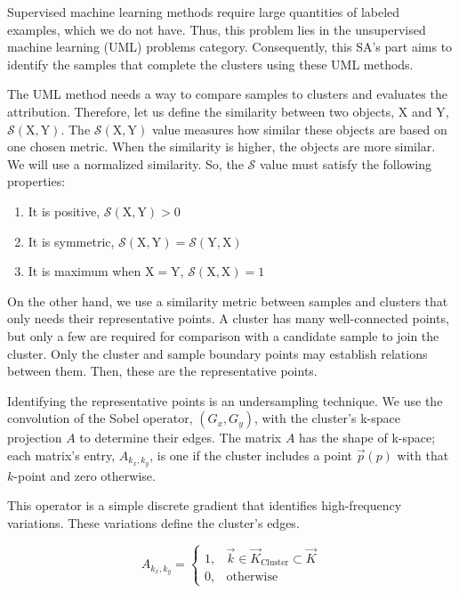 \documentclass[a4paper,12pt]{report}
\begin{document}
\begin{appendices}
Supervised machine learning methods require large quantities of labeled examples, which we do not have. Thus, this problem lies in the unsupervised machine learning (UML) problems category. Consequently, this SA's part aims to identify the samples that complete the clusters using these UML methods.

The UML method needs a way to compare samples to clusters and evaluates the attribution. Therefore, let us define the similarity between two objects, $\mathrm{X}$ and $\mathrm{Y}$, $\mathcal{S}(\mathrm{X}, \mathrm{Y})$. The $\mathcal{S}(\mathrm{X}, \mathrm{Y})$ value measures how similar these objects are based on one chosen metric. When the similarity is higher, the objects are more similar. We will use a normalized similarity.
So, the $\mathcal{S}$ value must satisfy the following properties:

\begin{enumerate}
    \item It is positive, $\mathcal{S}(\mathrm{X}, \mathrm{Y}) > 0$
    \item It is symmetric, $\mathcal{S}(\mathrm{X}, \mathrm{Y}) = \mathcal{S}(\mathrm{Y}, \mathrm{X})$
    \item It is maximum when $\mathrm{X}=\mathrm{Y}$, $\mathcal{S}(\mathrm{X}, \mathrm{X})=1$
\end{enumerate}

On the other hand, we use a similarity metric between samples and clusters that only needs their representative points. A cluster has many well-connected points, but only a few are required for comparison with a candidate sample to join the cluster. Only the cluster and sample boundary points may establish relations between them. Then, these are the representative points.

Identifying the representative points is an undersampling technique.
We use the convolution of the Sobel operator, $(G_x, G_y)$, with the cluster's k-space projection $A$ to determine their edges.
The matrix $A$ has the shape of k-space; each matrix's entry, $A_{k_x,k_y}$, is one if the cluster includes a point $\vec{p}(p)$ with that $k$-point and zero otherwise.

 This operator is a simple discrete gradient that identifies high-frequency variations. These variations define the cluster's edges.


\begin{equation}
    A_{k_x,k_y} = \left\{
    \begin{array}{cc}
        1, & \vec{k} \in \vec{K}_\text{Cluster}\subset \vec{K} \\
        0, & \text{otherwise}
    \end{array}
    \right.
\end{equation}


\end{appendices}
\end{document}

